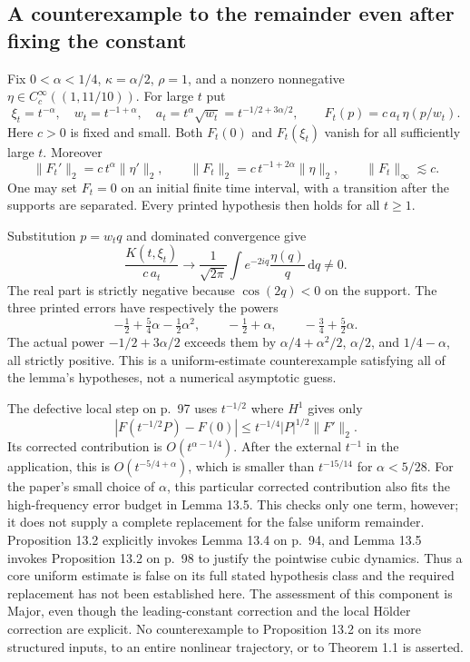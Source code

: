 \documentclass[10pt]{article}
\begin{document}
\subsection*{A counterexample to the remainder even after fixing the constant}
Fix \(0<\alpha<1/4\), \(\kappa=\alpha/2\), \(\rho=1\), and a nonzero nonnegative \(\eta\in C_c^\infty((1,11/10))\). For large \(t\) put \[\xi_t=t^{-\alpha},\quad w_t=t^{-1+\alpha},\quad
 a_t=t^\alpha\sqrt{w_t}=t^{-1/2+3\alpha/2},
 \qquad F_t(p)=c\,a_t\,\eta(p/w_t).\] Here \(c>0\) is fixed and small. Both \(F_t(0)\) and \(F_t(\xi_t)\) vanish for all sufficiently large \(t\). Moreover \[\|F_t'\|_2=c\,t^\alpha\|\eta'\|_2,\qquad
 \|F_t\|_2=c\,t^{-1+2\alpha}\|\eta\|_2,
 \qquad \|F_t\|_\infty\lesssim c.\] One may set \(F_t=0\) on an initial finite time interval, with a transition after the supports are separated. Every printed hypothesis then holds for all \(t\ge1\).\par
Substitution \(p=w_tq\) and dominated convergence give \[\frac{K(t,\xi_t)}{c\,a_t}\longrightarrow
 \frac1{\sqrt{2\pi}}\int e^{-2iq}\frac{\eta(q)}q\,\mathrm dq
 \ne0.\] The real part is strictly negative because \(\cos(2q)<0\) on the support. The three printed errors have respectively the powers \[-\tfrac12+\tfrac54\alpha-\tfrac12\alpha^2,\qquad
 -\tfrac12+\alpha,\qquad
 -\tfrac34+\tfrac52\alpha .\] The actual power \(-1/2+3\alpha/2\) exceeds them by \(\alpha/4+\alpha^2/2\), \(\alpha/2\), and \(1/4-\alpha\), all strictly positive. This is a uniform-estimate counterexample satisfying all of the lemma’s hypotheses, not a numerical asymptotic guess.\par
The defective local step on p. 97 uses \(t^{-1/2}\) where \(H^1\) gives only \[|F(t^{-1/2}P)-F(0)|
 \le t^{-1/4}|P|^{1/2}\|F'\|_2 .\] Its corrected contribution is \(O(t^{\alpha-1/4})\). After the external \(t^{-1}\) in the application, this is \(O(t^{-5/4+\alpha})\), which is smaller than \(t^{-15/14}\) for \(\alpha<5/28\). For the paper’s small choice of \(\alpha\), this particular corrected contribution also fits the high-frequency error budget in Lemma 13.5. This checks only one term, however; it does not supply a complete replacement for the false uniform remainder. Proposition 13.2 explicitly invokes Lemma 13.4 on p. 94, and Lemma 13.5 invokes Proposition 13.2 on p. 98 to justify the pointwise cubic dynamics. Thus a core uniform estimate is false on its full stated hypothesis class and the required replacement has not been established here. The assessment of this component is Major, even though the leading-constant correction and the local Hölder correction are explicit. No counterexample to Proposition 13.2 on its more structured inputs, to an entire nonlinear trajectory, or to Theorem 1.1 is asserted.\par
\end{document}

